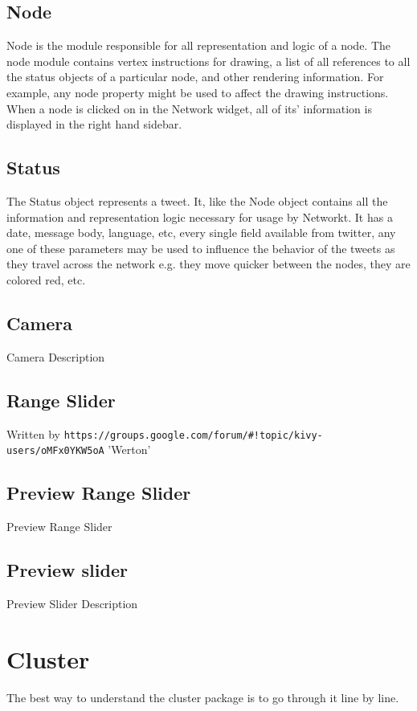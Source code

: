 \subsection{Node}
Node is the module responsible for all representation and logic of a node. The node module contains vertex instructions for drawing, a list of all references to all the status objects of a particular node, and other rendering information. For example, any node property might be used to affect the drawing instructions. When a node is clicked on in the Network widget, all of its' information is displayed in the right hand sidebar.

\subsection{Status}
The Status object represents a tweet. It, like the Node object contains all the information and representation logic necessary for usage by Networkt. It has a date, message body, language, etc, every single field available from twitter, any one of these parameters may be used to influence the behavior of the tweets as they travel across the network e.g. they move quicker between the nodes, they are colored red, etc.

\subsection{Camera}
Camera Description

\subsection{Range Slider}
Written by \verb|https://groups.google.com/forum/#!topic/kivy-users/oMFx0YKW5oA| 'Werton'

\subsection{Preview Range Slider}
Preview Range Slider

\subsection{Preview slider}
Preview Slider Description

\section{Cluster}
The best way to understand the cluster package is to go through it line by line.

